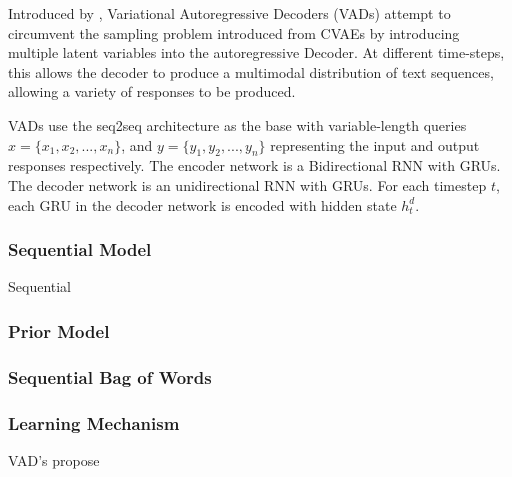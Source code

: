 \documentclass[12pt,twoside]{report}
\begin{document}
Introduced by \cite{du_variational_2018}, Variational Autoregressive Decoders (VADs) attempt to circumvent the sampling problem introduced from CVAEs by introducing multiple latent variables into the autoregressive Decoder. At different time-steps, this allows the decoder to produce a multimodal distribution of text sequences, allowing a variety of responses to be produced. 

VADs use the seq2seq architecture as the base with variable-length queries $x = \{x_1, x_2, ..., x_n\}$, and $y = \{y_1, y_2, ..., y_n\}$ representing the input and output responses respectively. The encoder network is a Bidirectional RNN with GRUs. The decoder network is an unidirectional RNN with GRUs. For each timestep $t$, each GRU in the decoder network is encoded with hidden state $h^d_t$.

\subsubsection{Sequential Model}

Sequential

\subsubsection{Prior Model}

\subsubsection{Sequential Bag of Words}

\subsubsection{Learning Mechanism}


VAD's propose 








 
\end{document}
